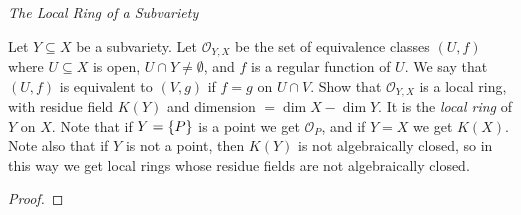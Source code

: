 \label{1.3.13}

\emph{The Local Ring of a Subvariety}

Let $Y \subseteq X$ be a subvariety. Let $\mathcal O_{Y, X}$ be the set of equivalence classes $(U, f)$ where $U \subseteq X$ is open, $U \cap Y \neq \emptyset$, and $f$ is a regular function of $U$. We say that $(U, f)$ is equivalent to $(V, g)$ if $f = g$ on $U \cap V$. Show that $\mathcal O_{Y, X}$ is a local ring, with residue field $K(Y)$ and dimension $= \dim X - \dim Y$. It is the \emph{local ring} of $Y$ on $X$. Note that if $Y = {\left\{P\right\}}$ is a point we get $\mathcal O_P$, and if $Y = X$ we get $K(X)$. Note also that if $Y$ is not a point, then $K(Y)$ is not algebraically closed, so in this way we get local rings whose residue fields are not algebraically closed.

\begin{proof}

\end{proof}
